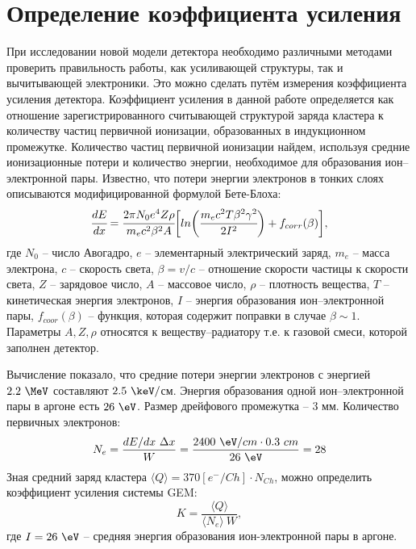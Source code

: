 \section{Определение коэффициента усиления}
\label{sec:ampl_c}
При исследовании новой модели детектора необходимо различными методами проверить правильность работы, как усиливающей структуры, так и вычитывающей электроники. Это можно сделать путём измерения коэффициента усиления детектора. 
Коэффициент усиления в данной работе определяется как отношение зарегистрированного считывающей структурой заряда кластера к количеству частиц первичной ионизации, образованных в индукционном промежутке. 
Количество частиц первичной ионизации найдем, используя средние ионизационные потери и количество энергии, необходимое для образования ион--электронной пары. Известно, что потери энергии электронов в тонких слоях описываются модифицированной формулой Бете-Блоха:
\begin{equation}
\cfrac{dE}{dx} = \cfrac{2\pi N_0 e^4 Z\rho}{m_e c^2 \beta^2 A}\biggl[ln \bigg(\cfrac{ m_ec^2T\beta^2\gamma^2}{2I^2}\bigg) + f_{corr}(\beta)\biggr],
\label{eq:Bethe_Bloch}
\end{equation}
где $N_0$ -- число Авогадро, $e$ -- элементарный электрический заряд, $m_e$ -- масса электрона, $c$ -- скорость света, $\beta = v/c$ -- отношение скорости частицы к скорости света, $Z$ -- зарядовое число, $A$ -- массовое число, $\rho$ -- плотность вещества, $T$ -- кинетическая энергия электронов, $I$ -- энергия образования ион--электронной пары, $f_{coor}(\beta)$ -- функция, которая содержит поправки в случае $\beta \sim 1$. Параметры $A,Z,\rho$ относятся к веществу--радиатору т.е. к газовой смеси, которой заполнен детектор.
\par Вычисление показало, что средние потери энергии электронов с энергией $2.2~\MeV$ составляют $2.5~\keV/$см. Энергия образования одной ион--электронной пары в аргоне есть $26~\eV$. Размер дрейфового промежутка -- 3 мм. Количество первичных электронов:
\begin{equation}
	N_e = \frac{dE/dx~\Delta x}{W} =\frac {2400~\eV/cm \cdot 0.3~cm}{26~\eV} = 28
\end{equation}
Зная средний заряд кластера $\langle Q\rangle = 370 [e^-/Ch] \cdot N_{Ch}$, можно определить коэффициент усиления системы GEM: 
\begin{equation}
K = \frac{\langle Q\rangle}{\langle N_e \rangle\ W},
\label{eq:ampl_k}
\end{equation}
где $I = 26~\eV$ -- средняя энергия образования ион-электронной пары в аргоне. 
